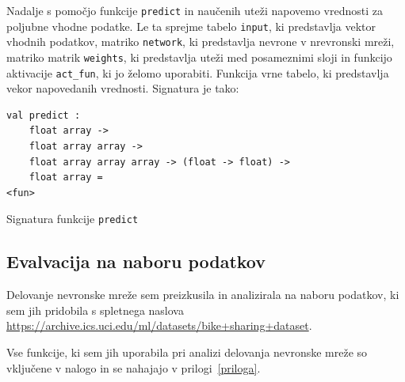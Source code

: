 \documentclass[mat1]{fmfdelo}
\begin{document}
Nadalje s pomočjo funkcije \texttt{predict} in naučenih uteži napovemo vrednosti za poljubne vhodne podatke. Le ta sprejme tabelo \texttt{input}, ki predstavlja vektor vhodnih podatkov, matriko \texttt{network}, ki predstavlja nevrone v nrevronski mreži, matriko matrik \texttt{weights}, ki predstavlja uteži med posameznimi sloji in funkcijo aktivacije \texttt{act\_fun}, ki jo želomo uporabiti. Funkcija vrne tabelo, ki predstavlja vekor napovedanih vrednosti. Signatura je tako:
%
\begin{listing}[!h]
	\begin{verbatim}
val predict :
	float array ->
	float array array ->
	float array array array -> (float -> float) -> 
	float array = 
<fun>
	\end{verbatim} 
	\caption{Signatura funkcije \texttt{predict}}
	\label{signatura2}
\end{listing}
%
\subsection{Evalvacija na naboru podatkov}
Delovanje nevronske mreže sem preizkusila in analizirala na naboru podatkov, ki sem jih pridobila s spletnega naslova \url{https://archive.ics.uci.edu/ml/datasets/bike+sharing+dataset}.

 Vse fun\-kci\-je, ki sem jih uporabila pri analizi delovanja nevronske mreže so vključene v nalogo in se nahajajo v prilogi~\ref{priloga}.
%
\end{document}
